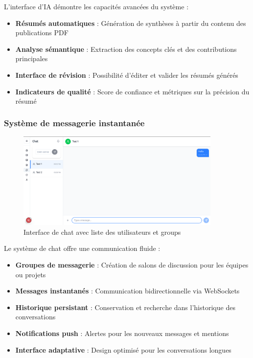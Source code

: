 \documentclass[12pt]{rapportPfe}
\begin{document}
L'interface d'IA démontre les capacités avancées du système :
\begin{itemize}
    \item \textbf{Résumés automatiques} : Génération de synthèses à partir du contenu des publications PDF
    \item \textbf{Analyse sémantique} : Extraction des concepts clés et des contributions principales
    \item \textbf{Interface de révision} : Possibilité d'éditer et valider les résumés générés
    \item \textbf{Indicateurs de qualité} : Score de confiance et métriques sur la précision du résumé
\end{itemize}

\subsubsection{Système de messagerie instantanée}

\begin{figure}[H]
    \centering
    \includegraphics[width=0.9\textwidth]{diagrams/a_ss_06.png}
    \caption{Interface de chat avec liste des utilisateurs et groups}
    \label{fig:chat}
\end{figure}

Le système de chat offre une communication fluide :
\begin{itemize}
    \item \textbf{Groupes de messagerie} : Création de salons de discussion pour les équipes ou projets
    \item \textbf{Messages instantanés} : Communication bidirectionnelle via WebSockets
    \item \textbf{Historique persistant} : Conservation et recherche dans l'historique des conversations
    \item \textbf{Notifications push} : Alertes pour les nouveaux messages et mentions
    \item \textbf{Interface adaptative} : Design optimisé pour les conversations longues
\end{itemize}
\end{document}
